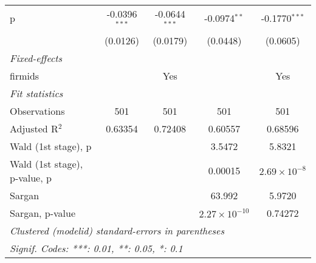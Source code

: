 \begin{tabular}{lcccc}
   p                            & -0.0396$^{***}$ & -0.0644$^{***}$ & -0.0974$^{**}$         & -0.1770$^{***}$\\   
                                & (0.0126)        & (0.0179)        & (0.0448)               & (0.0605)\\   
   \midrule
   \emph{Fixed-effects}\\
   firmids                      &                 & Yes             &                        & Yes\\  
   \midrule
   \emph{Fit statistics}\\
   Observations                 & 501             & 501             & 501                    & 501\\  
   Adjusted R$^2$               & 0.63354         & 0.72408         & 0.60557                & 0.68596\\  
   Wald (1st stage), p          &                 &                 & 3.5472                 & 5.8321\\  
   Wald (1st stage), p-value, p &                 &                 & 0.00015                & $2.69\times 10^{-8}$\\   
   Sargan                       &                 &                 & 63.992                 & 5.9720\\  
   Sargan, p-value              &                 &                 & $2.27\times 10^{-10}$  & 0.74272\\  
   \midrule \midrule
   \multicolumn{5}{l}{\emph{Clustered (modelid) standard-errors in parentheses}}\\
   \multicolumn{5}{l}{\emph{Signif. Codes: ***: 0.01, **: 0.05, *: 0.1}}\\
\end{tabular}
\par\endgroup


